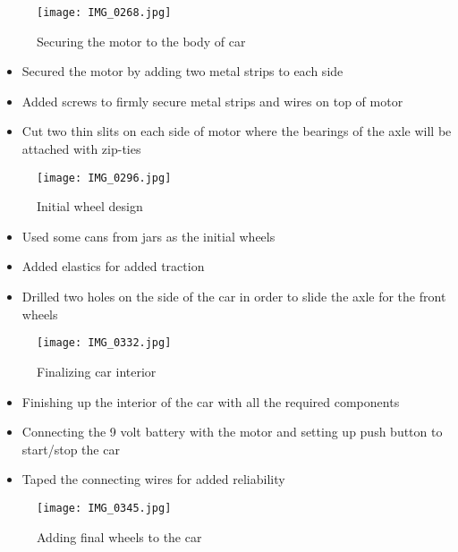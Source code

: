 \documentclass[12pt]{article}
\begin{document}
\begin{figure}[H]
    \centering
    \texttt{[image: IMG\_0268.jpg]}
    \caption{Securing the motor to the body of car}
    \label{fig:enter-label}
\end{figure}

\begin{itemize}
    \item Secured the motor by adding two metal strips to each side
    \item Added screws to firmly secure metal strips and wires on top of motor
    \item Cut two thin slits on each side of motor where the bearings of the axle will be attached with zip-ties
  \end{itemize}


\begin{figure}[H]
    \centering
    \texttt{[image: IMG\_0296.jpg]}
    \caption{Initial wheel design}
    \label{fig:enter-label}
\end{figure}

\begin{itemize}
    \item Used some cans from jars as the initial wheels
    \item Added elastics for added traction
    \item Drilled two holes on the side of the car in order to slide the axle for the front wheels
    
  \end{itemize}


\begin{figure}[H]
    \centering
    \texttt{[image: IMG\_0332.jpg]}
    \caption{Finalizing car interior}
    \label{fig:enter-label}
\end{figure}

\begin{itemize}
    \item Finishing up the interior of the car with all the required components 
    \item Connecting the 9 volt battery with the motor and setting up push button to start/stop the car
    \item Taped the connecting wires for added reliability
    
  \end{itemize}


\begin{figure}[H]
    \centering
    \texttt{[image: IMG\_0345.jpg]}
    \caption{Adding final wheels to the car}
    \label{fig:enter-label}
\end{figure}
\end{document}
